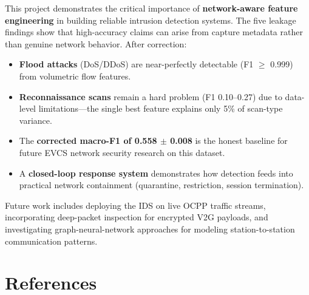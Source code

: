 \documentclass[11pt, a4paper]{article}
\begin{document}
This project demonstrates the critical importance of \textbf{network-aware feature engineering} in building reliable intrusion detection systems. The five leakage findings show that high-accuracy claims can arise from capture metadata rather than genuine network behavior. After correction:

\begin{itemize}[leftmargin=1.4em, itemsep=0.3em]
    \item \textbf{Flood attacks} (DoS/DDoS) are near-perfectly detectable (F1 $\geq$ 0.999) from volumetric flow features.
    \item \textbf{Reconnaissance scans} remain a hard problem (F1 0.10--0.27) due to data-level limitations—the single best feature explains only 5\% of scan-type variance.
    \item The \textbf{corrected macro-F1 of 0.558 $\pm$ 0.008} is the honest baseline for future EVCS network security research on this dataset.
    \item A \textbf{closed-loop response system} demonstrates how detection feeds into practical network containment (quarantine, restriction, session termination).
\end{itemize}

\noindent
Future work includes deploying the IDS on live OCPP traffic streams, incorporating deep-packet inspection for encrypted V2G payloads, and investigating graph-neural-network approaches for modeling station-to-station communication patterns.

\section*{References}
\end{document}

